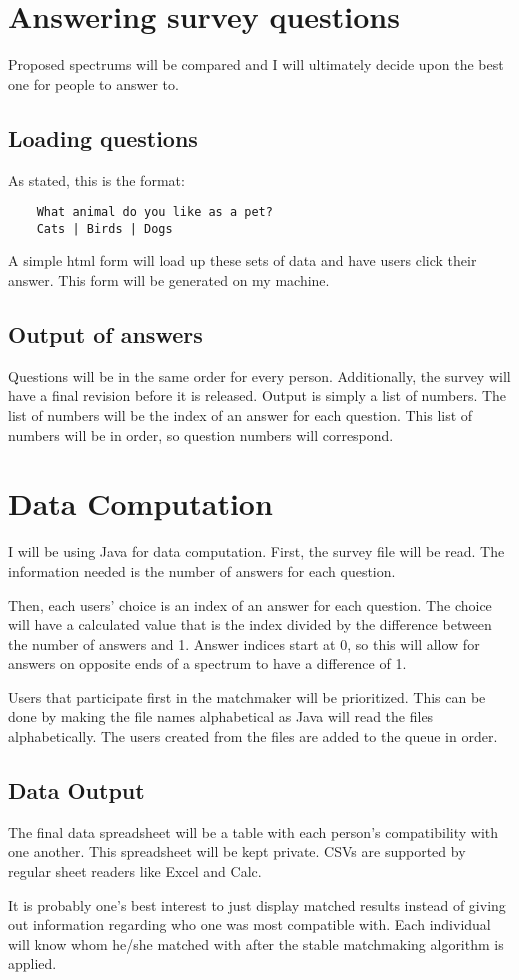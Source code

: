 \documentclass[12pt]{article}
\begin{document}
\section{Answering survey questions}
Proposed spectrums will be compared and I will ultimately decide upon the best
one for people to answer to.

\subsection{Loading questions}
As stated, this is the format:
\begin{verbatim}
    What animal do you like as a pet?
    Cats | Birds | Dogs
\end{verbatim}

A simple html form will load up these sets of data and have users click their
answer. This form will be generated on my machine.

\subsection{Output of answers}
Questions will be in the same order for every person. Additionally, the survey
will have a final revision before it is released. Output is simply a list of
numbers. The list of numbers will be the index of an answer for each question.
This list of numbers will be in order, so question numbers will correspond.

\section{Data Computation}
I will be using Java for data computation.
First, the survey file will be read. The information needed is the number of
answers for each question.

Then, each users' choice is an index of an answer for each question. The choice
will have a calculated value that is the index divided by the difference between
the number of answers and 1. Answer indices start at 0, so this will allow for
answers on opposite ends of a spectrum to have a difference of 1.

Users that participate first in the matchmaker will be prioritized. This can be
done by making the file names alphabetical as Java will read the files
alphabetically. The users created from the files are added to the queue in
order.

\subsection{Data Output}
The final data spreadsheet will be a table with each person's compatibility
with one another. This spreadsheet will be kept private. CSVs are supported by
regular sheet readers like Excel and Calc.

It is probably one's best interest to just display matched results instead of
giving out information regarding who one was most compatible with. Each
individual will know whom he/she matched with after the stable matchmaking
algorithm is applied.
\end{document}
